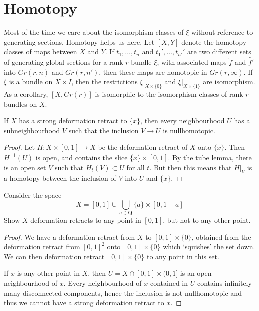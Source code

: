 \section{Homotopy}

Most of the time we care about the isomorphism classes of $\xi$ without reference to generating sections. Homotopy helps us here.  Let $[X,Y]$ denote the homotopy classes of maps between $X$ and $Y$. If $t_1, \dots, t_n$ and $t_1', \dots, t_{n'}'$ are two different sets of generating global sections for a rank $r$ bundle $\xi$, with associated maps $\tilde{f}$ and $\tilde{f'}$ into $Gr(r,n)$ and $Gr(r,n')$, then these maps are homotopic in $Gr(r,\infty)$. If $\xi$ is a bundle on $X \times I$, then the restrictions $\xi|_{X \times \{ 0 \}}$ and $\xi|_{X \times \{ 1 \}}$ are isomorphism. As a corollary, $[X,Gr(r)]$ is isomorphic to the isomorphism classes of rank $r$ bundles on $X$.

















\begin{theorem}
    If $X$ has a strong deformation retract to $\{ x \}$, then every neighbourhood $U$ has a subneighbourhood $V$ such that the inclusion $V \to U$ is nullhomotopic.
\end{theorem}
\begin{proof}
    Let $H: X \times [0,1] \to X$ be the deformation retract of $X$ onto $\{ x \}$. Then $H^{-1}(U)$ is open, and contains the slice $\{ x \} \times [0,1]$. By the tube lemma, there is an open set $V$ such that $H_t(V) \subset U$ for all $t$. But then this means that $H|_V$ is a homotopy between the inclusion of $V$ into $U$ and $\{ x \}$.
\end{proof}

\begin{theorem}
    Consider the space
    \[ X = [0,1] \cup \bigcup_{a \in \mathbf{Q}} \{ a \} \times [0,1-a] \]
    Show $X$ deformation retracts to any point in $[0,1]$, but not to any other point.
\end{theorem}
\begin{proof}
    We have a deformation retract from $X$ to $[0,1] \times \{ 0 \}$, obtained from the deformation retract from $[0,1]^2$ onto $[0,1] \times \{ 0 \}$ which `squishes' the set down. We can then deformation retract $[0,1] \times \{ 0 \}$ to any point in this set.

    If $x$ is any other point in $X$, then $U = X \cap [0,1] \times (0,1]$ is an open neighbourhood of $x$. Every neighbourhood of $x$ contained in $U$ contains infinitely many disconnected components, hence the inclusion is not nullhomotopic and thus we cannot have a strong deformation retract to $x$.
\end{proof}

